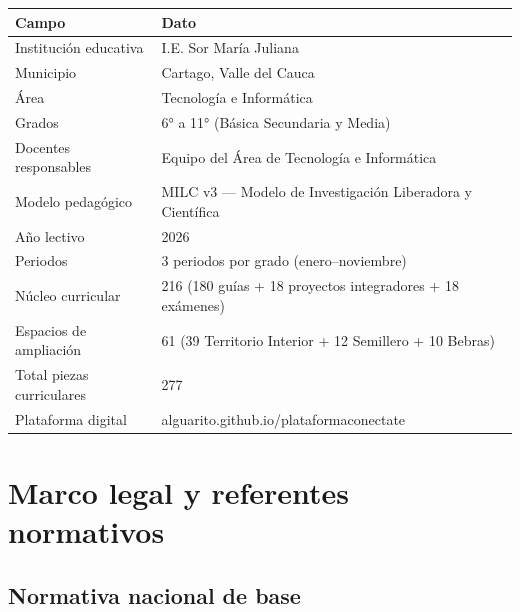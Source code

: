\documentclass[12pt, a4paper]{article}
\begin{document}
\begin{center}
\begin{tabular}{|L{5cm}|L{9cm}|}
\hline
{}\color{white}\textbf{Campo} & \color{white}\textbf{Dato} \\
\hline
Institución educativa & I.E. Sor María Juliana \\
\hline
Municipio & Cartago, Valle del Cauca \\
\hline
Área & Tecnología e Informática \\
\hline
Grados & 6° a 11° (Básica Secundaria y Media) \\
\hline
Docentes responsables & Equipo del Área de Tecnología e Informática \\
\hline
Modelo pedagógico & MILC v3 — Modelo de Investigación Liberadora y Científica \\
\hline
Año lectivo & 2026 \\
\hline
Periodos & 3 periodos por grado (enero–noviembre) \\
\hline
Núcleo curricular & 216 (180 guías + 18 proyectos integradores + 18 exámenes) \\
\hline
Espacios de ampliación & 61 (39 Territorio Interior + 12 Semillero + 10 Bebras) \\
\hline
Total piezas curriculares & 277 \\
\hline
Plataforma digital & alguarito.github.io/plataformaconectate \\
\hline
\end{tabular}
\end{center}

\section{Marco legal y referentes normativos}

\subsection{Normativa nacional de base}
\end{document}
